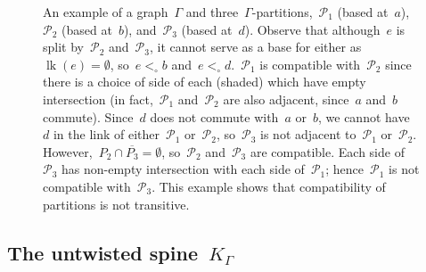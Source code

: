 \documentclass[11pt]{amsart}
\theoremstyle{definition}
\theoremstyle{definition}
\theoremstyle{definition}
\theoremstyle{definition}
\newcommand{\calP}{\mathcal{P}} %
\newcommand{\link}[1]{\operatorname{lk}({#1})} %
\newcommand{\spine}{K_{\Gamma}} %
\begin{document}
\begin{figure}
\begin{center}
        \caption{An example of a graph~$\Gamma$ and three~$\Gamma$-partitions,~$\calP_1$ (based at~$a$),~$\calP_2$ (based at~$b$), and~$\calP_3$ (based at~$d$). Observe that although~$e$ is split by~$\calP_2$ and~$\calP_3$, it cannot serve as a base for either as~$\link{e} = \emptyset$, so~$e <_\circ b$ and~$e <_\circ d$.~$\calP_1$ is compatible with~$\calP_2$ since there is a choice of side of each (shaded) which have empty intersection (in fact,~$\calP_1$ and~$\calP_2$ are also adjacent, since~$a$ and~$b$ commute). Since~$d$ does not commute with~$a$ or~$b$, we cannot have~$d$ in the link of either~$\calP_1$ or~$\calP_2$, so~$\calP_3$ is not adjacent to~$\calP_1$ or~$\calP_2$. However,~$P_2 \cap \overline{P_3} = \emptyset$, so~$\calP_2$ and~$\calP_3$ are compatible. Each side of~$\calP_3$ has non-empty intersection with each side of~$\calP_1$; hence~$\calP_1$ is not compatible with~$\calP_3$. This example shows that compatibility of partitions is not transitive.}
        \label{fig:compatibility is not transitive}
    \end{center}
\end{figure}

\subsection{The untwisted spine~$\spine$}\label{subsec:untwisted spine}
\end{document}
